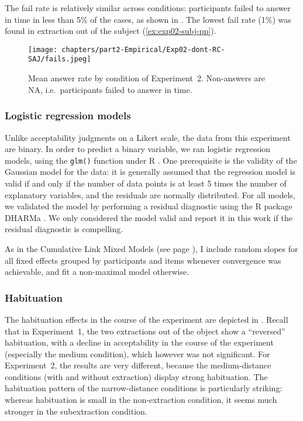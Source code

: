The fail rate is relatively similar across conditions: participants failed to answer in time in less than 5\% of the cases, as shown in . The lowest fail rate (1\%) was found in extraction out of the subject (\ref{ex:exp02-subj-pp}).

\begin{figure}
    \centering
    \texttt{[image: chapters/part2-Empirical/Exp02-dont-RC-SAJ/fails.jpeg]}
    \caption{Mean answer rate by condition of Experiment~2. Non-answers are NA, i.e.\ participants failed to answer in time.}
    \label{fig:exp02-fails}
\end{figure}

\subsubsection{Logistic regression models}\label{ch:logistic-regression-binary}
Unlike acceptability judgments on a Likert scale, the data from this experiment are binary. In order to predict a binary variable, we ran logistic regression models, using the \texttt{glm()} function under R \citep{R}. One prerequisite is the validity of the Gaussian model for the data: it is generally assumed that the regression model is valid if and only if the number of data points is at least 5 times the number of explanatory variables, and the residuals are normally distributed. For all models, we validated the model by performing a residual diagnostic using the R package DHARMa \citep{DARMa}. We only considered the model valid and report it in this work if the residual diagnostic is compelling.

As in the Cumulative Link Mixed Models (see page \pageref{ch:cumulative-link-model}), I include random slopes for all fixed effects grouped by participants and items whenever convergence was achievable, and fit a non-maximal model otherwise.

\subsubsection{Habituation} 

The habituation effects in the course of the experiment are depicted in . Recall that in Experiment~1, the two extractions out of the object show a ``reversed'' habituation, with a decline in acceptability in the course of the experiment (especially the medium condition), which however was not significant. For Experiment~2, the results are very different, because the medium-distance conditions (with and without extraction) display strong habituation. The habituation pattern of the narrow-distance conditions is particularly striking: whereas habituation is small in the non-extraction condition, it seems much stronger in the subextraction condition. 

